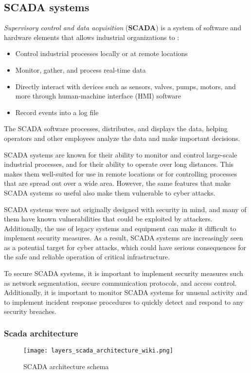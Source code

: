 \subsection{SCADA systems}
\textit{Supervisory control and data acquisition} (\textbf{SCADA}) is a system of software and hardware elements that allows industrial organizations to \cite{scada_definition}:
\begin{itemize}
	\item Control industrial processes locally or at remote locations
	\item Monitor, gather, and process real-time data
	\item Directly interact with devices such as sensors, valves, pumps, motors, and more through human-machine interface (HMI) software
	\item Record events into a log file
\end{itemize}

The SCADA software processes, distributes, and displays the data, helping operators and other employees analyze the data and make important decisions.

\bigskip
SCADA systems are known for their ability to monitor and control large-scale industrial processes, and for their ability to operate over long distances. This makes them well-suited for use in remote locations or for controlling processes that are spread out over a wide area. However, the same features that make SCADA systems so useful also make them vulnerable to cyber attacks.

SCADA systems were not originally designed with security in mind, and many of them have known vulnerabilities that could be exploited by attackers. Additionally, the use of legacy systems and equipment can make it difficult to implement security measures. As a result, SCADA systems are increasingly seen as a potential target for cyber attacks, which could have serious consequences for the safe and reliable operation of critical infrastructure.

To secure SCADA systems, it is important to implement security measures such as network segmentation, secure communication protocols, and access control. Additionally, it is important to monitor SCADA systems for unusual activity and to implement incident response procedures to quickly detect and respond to any security breaches.

\subsubsection{Scada architecture}
\begin{figure}[h]
	\centering
	\texttt{[image: layers\_scada\_architecture\_wiki.png]}
	\caption{SCADA architecture schema}
	\label{fig:SCADA_schema}
\end{figure}

